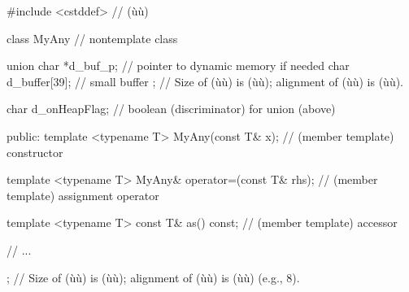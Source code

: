 %
%
%
%
%
%
%
%
\begin{emcppslisting}
#include <cstddef>  // (ù{}ù)

class MyAny  // nontemplate class
{
    union {
        char *d_buf_p;       // pointer to dynamic memory if needed
        char  d_buffer[39];  // small buffer
    };  // Size of (ù{}ù) is (ù{}ù); alignment of (ù{}ù) is (ù{}ù).

    char d_onHeapFlag;             // boolean (discriminator) for union (above)

public:
    template <typename T>
    MyAny(const T& x);               // (member template) constructor

    template <typename T>
    MyAny& operator=(const T& rhs);  // (member template) assignment operator

    template <typename T>
    const T& as() const;             // (member template) accessor

    // ...

};  // Size of (ù{}ù) is (ù{}ù); alignment of (ù{}ù) is (ù{}ù) (e.g., 8).
\end{emcppslisting}

